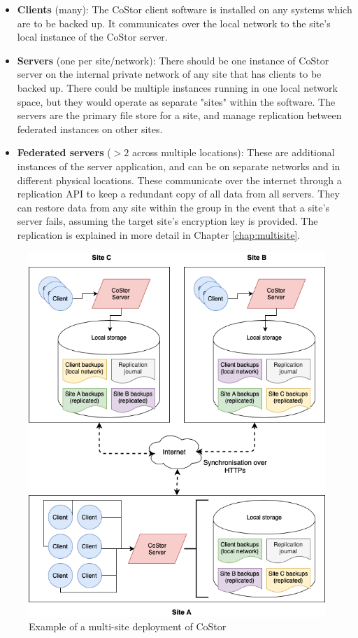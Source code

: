 \documentclass[bsc,frontabs,twoside,singlespacing,parskip,deptreport]{infthesis}     %
\begin{document}
\begin{itemize}
	\item \textbf{Clients} (many):
	\subitem The CoStor client software is installed on any systems which are to be backed up.
	It communicates over the local network to the site's local instance of the CoStor server.
	
	\item \textbf{Servers} (one per site/network):
	\subitem  There should be one instance of CoStor server on the internal private network of 
	any site that has clients to be backed up. There could be multiple instances running in one
	local network space, but they would operate as separate "sites" within the software. The 
	servers are the primary file store for a site, and manage replication between federated
	instances on other sites.
	
	\item \textbf{Federated servers} ($>2$ across multiple locations):
	\subitem These are additional instances of the server application, and can be on separate
	networks and in different physical locations. These communicate over the internet through
	a replication API to keep a redundant copy of all data from all servers. They can restore
	data from any site within the group in the event that a site's server fails, assuming the 
	target site's encryption key is provided. The replication is explained in more detail in 
	Chapter \ref{chap:multisite}.
\end{itemize}

\begin{figure}
	\includegraphics[width=\linewidth]{img/replication.png}
	\caption{Example of a multi-site deployment of CoStor}
	\label{fig:multisite}
\end{figure}
\end{document}
